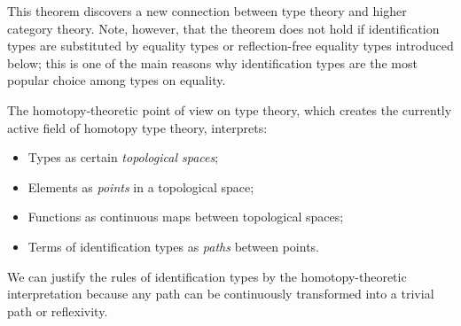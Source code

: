 \documentclass[11pt]{article}
\begin{document}
This theorem discovers a new connection between type theory and higher category theory. Note, however, that the theorem does not hold if identification types are substituted by equality types or reflection-free equality types introduced below; this is one of the main reasons why identification types are the most popular choice among types on equality.

The homotopy-theoretic point of view on type theory, which creates the currently active field of homotopy type theory, interprets:

\begin{itemize}
\item Types as certain \emph{topological spaces};
\item Elements as \emph{points} in a topological space;
\item Functions as continuous maps between topological spaces;
\item Terms of identification types as \emph{paths} between points. 
\end{itemize}

We can justify the rules of identification types by the homotopy-theoretic interpretation because any path can be continuously transformed into a trivial path or reflexivity.

\printbibliography
\end{document}
